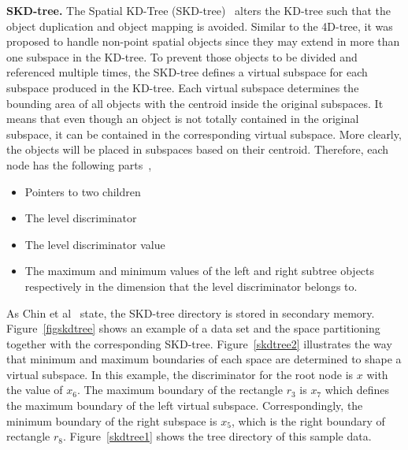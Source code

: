 \documentclass[a4paper,12pt]{article}
\begin{document}
\textbf{SKD-tree.} The Spatial KD-Tree (SKD-tree)~\cite{skdtree} alters the KD-tree such that the object duplication and object mapping is avoided. Similar to the 4D-tree, it was proposed to handle non-point spatial objects since they may extend in more than one subspace in the KD-tree. To prevent those objects to be divided and referenced multiple times, the SKD-tree defines a virtual subspace for each subspace produced in the KD-tree. Each virtual subspace determines the bounding area of all objects with the centroid inside the original subspaces. It means that even though an object is not totally contained in the original subspace, it can be contained in the corresponding virtual subspace. More clearly, the objects will be placed in subspaces based on their centroid. Therefore, each node has the following parts~\cite{skdtreebook},
\begin{itemize}
\item Pointers to two children
\item The level discriminator
\item The level discriminator value
\item The maximum and minimum values of the left and right subtree objects respectively in the dimension that the level discriminator belongs to.
\end{itemize}    
As Chin et al~\cite{survey} state, the SKD-tree directory is stored in secondary memory. Figure~\ref{figskdtree} shows an example of a data set and the space partitioning together with the corresponding SKD-tree. Figure~\ref{skdtree2} illustrates the way that minimum and maximum boundaries of each space are determined to shape a virtual subspace. In this example, the discriminator for the root node is $x$ with the value of $x_6$.
The maximum boundary of the rectangle $r_3$ is $x_7$ which defines the maximum boundary of the left virtual subspace. Correspondingly, the minimum boundary of the right subspace is $x_5$, which is the right boundary of rectangle $r_8$. Figure~\ref{skdtree1} shows the tree directory of this sample data.
\end{document}
